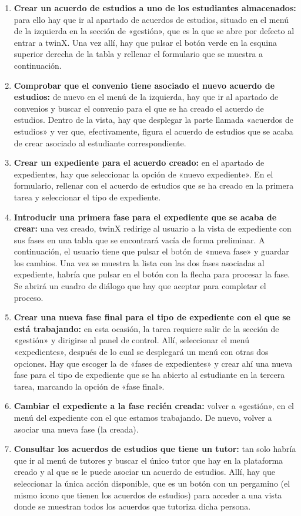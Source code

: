 \begin{enumerate}
	\item \textbf{Crear un acuerdo de estudios a uno de los estudiantes almacenados:} para ello hay que ir al apartado de acuerdos de estudios, situado en el menú de la izquierda en la sección de «gestión», que es la que se abre por defecto al entrar a twinX. Una vez allí, hay que pulsar el botón verde en la esquina superior derecha de la tabla y rellenar el formulario que se muestra a continuación.
	\item \textbf{Comprobar que el convenio tiene asociado el nuevo acuerdo de estudios:} de nuevo en el menú de la izquierda, hay que ir al apartado de convenios y buscar el convenio para el que se ha creado el acuerdo de estudios. Dentro de la vista, hay que desplegar la parte llamada «acuerdos de estudios» y ver que, efectivamente, figura el acuerdo de estudios que se acaba de crear asociado al estudiante correspondiente.
	\item \textbf{Crear un expediente para el acuerdo creado:} en el apartado de expedientes, hay que seleccionar la opción de «nuevo expediente». En el formulario, rellenar con el acuerdo de estudios que se ha creado en la primera tarea y seleccionar el tipo de expediente.
	\item \textbf{Introducir una primera fase para el expediente que se acaba de crear:} una vez creado, twinX redirige al usuario a la vista de expediente con sus fases en una tabla que se encontrará vacía de forma preliminar. A continuación, el usuario tiene que pulsar el botón de «nueva fase» y guardar los cambios. Una vez se muestra la lista con las dos fases asociadas al expediente, habría que pulsar en el botón con la flecha para procesar la fase. Se abrirá un cuadro de diálogo que hay que aceptar para completar el proceso.
	\item \textbf{Crear una nueva fase final para el tipo de expediente con el que se está trabajando:} en esta ocasión, la tarea requiere salir de la sección de «gestión» y dirigirse al panel de control. Allí, seleccionar el menú «expedientes», después de lo cual se desplegará un menú con otras dos opciones. Hay que escoger la de «fases de expedientes» y crear ahí una nueva fase para el tipo de expediente que se ha abierto al estudiante en la tercera tarea, marcando la opción de «fase final».
	\item \textbf{Cambiar el expediente a la fase recién creada:} volver a «gestión», en el menú del expediente con el que estamos trabajando. De nuevo, volver a asociar una nueva fase (la creada).
	\item \textbf{Consultar los acuerdos de estudios que tiene un tutor:} tan solo habría que ir al menú de tutores y buscar el único tutor que hay en la plataforma creado y al que se le puede asociar un acuerdo de estudios. Allí, hay que seleccionar la única acción disponible, que es un botón con un pergamino (el mismo icono que tienen los acuerdos de estudios) para acceder a una vista donde se muestran todos los acuerdos que tutoriza dicha persona. 
\end{enumerate}


